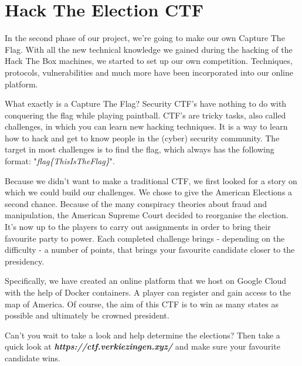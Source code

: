 \documentclass[../main.tex]{subfiles}
\begin{document}
\section{Hack The Election CTF}
In the second phase of our project, we're going to make our own Capture The Flag. With all the new technical knowledge we gained during the hacking of the Hack The Box machines, we started to set up our own competition. Techniques, protocols, vulnerabilities and much more have been incorporated into our online platform.

What exactly is a Capture The Flag? Security CTF's have nothing to do with conquering the flag while playing paintball. CTF's are tricky tasks, also called challenges, in which you can learn new hacking techniques. It is a way to learn how to hack and get to know people in the (cyber) security community. The target in most challenges is to find the flag, which always has the following format: "\textit{flag\{ThisIsTheFlag\}}".

Because we didn't want to make a traditional CTF, we first looked for a story on which we could build our challenges. We chose to give the American Elections a second chance. Because of the many conspiracy theories about fraud and manipulation, the American Supreme Court decided to reorganise the election. It's now up to the players to carry out assignments in order to bring their favourite party to power. Each completed challenge brings - depending on the difficulty - a number of points, that brings your favourite candidate closer to the presidency.

Specifically, we have created an online platform that we host on Google Cloud with the help of Docker containers. A player can register and gain access to the map of America. Of course, the aim of this CTF is to win as many states as possible and ultimately be crowned president.

Can't you wait to take a look and help determine the elections? Then take a quick look at \textit{\textbf{https://ctf.verkiezingen.xyz/}} and make sure your favourite candidate wins.
\end{document}
